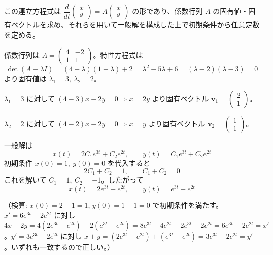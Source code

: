 
この連立方程式は $\dfrac{d}{dt}\begin{pmatrix} x \\ y \end{pmatrix} = A \begin{pmatrix} x \\ y \end{pmatrix}$ の形であり、係数行列 $A$ の固有値・固有ベクトルを求め、それらを用いて一般解を構成した上で初期条件から任意定数を定める。

係数行列は $A = \begin{pmatrix} 4 & -2 \\ 1 & 1 \end{pmatrix}$。特性方程式は
\[
\det(A - \lambda I) = (4-\lambda)(1-\lambda) + 2 = \lambda^{2} - 5\lambda + 6 = (\lambda-2)(\lambda-3) = 0
\]
より固有値は $\lambda_{1} = 3,\ \lambda_{2} = 2$。

\noindent
$\lambda_{1} = 3$ に対して $(4-3)x - 2y = 0 \Rightarrow x = 2y$ より固有ベクトル $\bm{v}_{1} = \begin{pmatrix} 2 \\ 1 \end{pmatrix}$。

\noindent
$\lambda_{2} = 2$ に対して $(4-2)x - 2y = 0 \Rightarrow x = y$ より固有ベクトル $\bm{v}_{2} = \begin{pmatrix} 1 \\ 1 \end{pmatrix}$。

\noindent
一般解は
\[
x(t) = 2C_{1}e^{3t} + C_{2}e^{2t}, \qquad
y(t) = C_{1}e^{3t} + C_{2}e^{2t}
\]
初期条件 $x(0) = 1,\ y(0) = 0$ を代入すると
\[
2C_{1} + C_{2} = 1, \qquad C_{1} + C_{2} = 0
\]
これを解いて $C_{1} = 1,\ C_{2} = -1$。したがって
\[
\boxed{\;
x(t) = 2e^{3t} - e^{2t}, \qquad
y(t) = e^{3t} - e^{2t}
\;}
\]

（検算: $x(0) = 2-1 = 1$, $y(0) = 1-1 = 0$ で初期条件を満たす。$x' = 6e^{3t}-2e^{2t}$ に対し $4x-2y = 4(2e^{3t}-e^{2t})-2(e^{3t}-e^{2t}) = 8e^{3t}-4e^{2t}-2e^{3t}+2e^{2t} = 6e^{3t}-2e^{2t} = x'$。$y' = 3e^{3t}-2e^{2t}$ に対し $x+y = (2e^{3t}-e^{2t})+(e^{3t}-e^{2t}) = 3e^{3t}-2e^{2t} = y'$。いずれも一致するので正しい。）
